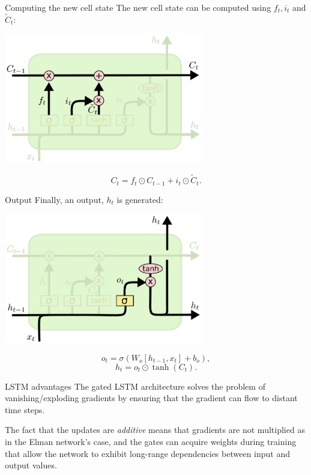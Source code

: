 \documentclass[style=upen, size=14pt]{powerdot}
\theoremstyle{definition}
\begin{document}
\begin{slide}[toc=New cell state]{Computing the new cell state}
  The new cell state can be computed using $f_t, i_t$ and
  $\tilde C_t$:
  \begin{center}
    \includegraphics[width=0.65\textwidth]{figures/lstm_c.eps}
  \end{center}
  $$
  C_t = f_t \odot C_{t-1} + i_t \odot \tilde C_t.
  $$
\end{slide}

\begin{slide}[toc=Output]{Output}
  Finally, an output, $h_t$ is generated:
  \begin{center}
    \includegraphics[width=0.65\textwidth]{figures/lstm_out.eps}
  \end{center}
  $$
  o_t = \sigma(W_o[h_{t-1}, x_t] + b_o),
  $$
  $$
  h_t = o_t \odot \tanh(C_t).
  $$
\end{slide}

\begin{slide}[toc=Advantages]{LSTM advantages}
  The gated LSTM architecture solves the problem of vanishing/exploding
  gradients by ensuring that the gradient can flow to distant time steps.\bigskip

  The fact that the updates are \emph{additive} means that gradients are not
  multiplied as in the Elman network's case, and the gates can acquire weights
  during training that allow the network to exhibit long-range dependencies
  between input and output values.
\end{slide}
\end{document}
